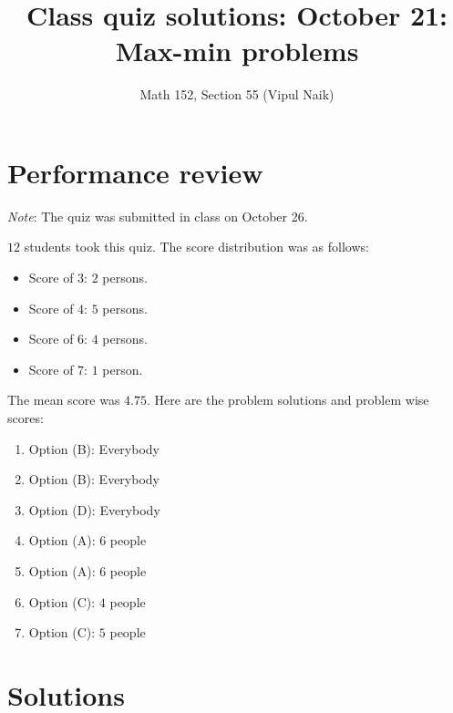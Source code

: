 \documentclass[10pt]{amsart}
\title{Class quiz solutions: October 21: Max-min problems}
\author{Math 152, Section 55 (Vipul Naik)}
\begin{document}
\maketitle

\section{Performance review}

{\em Note}: The quiz was submitted in class on October 26.

$12$ students took this quiz. The score distribution was as follows:

\begin{itemize}
\item Score of $3$: $2$ persons.
\item Score of $4$: $5$ persons.
\item Score of $6$: $4$ persons.
\item Score of $7$: $1$ person.
\end{itemize}

The mean score was $4.75$. Here are the problem solutions and problem
wise scores:

\begin{enumerate}
\item Option (B): Everybody
\item Option (B): Everybody
\item Option (D): Everybody
\item Option (A): $6$ people
\item Option (A): $6$ people
\item Option (C): $4$ people
\item Option (C): $5$ people
\end{enumerate}
\section{Solutions}
\end{document}
